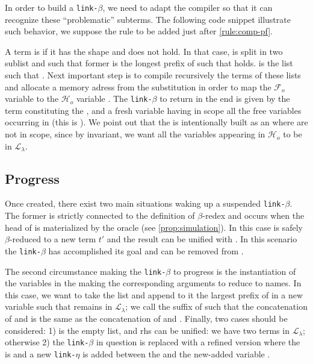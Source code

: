 \documentclass[sigconf,natbib=false,review]{acmart}
\newcommand{\llambda}{\ensuremath{\mathcal{L}_\lambda}\xspace}
\newcommand{\linkbeta}{\texttt{link-}\ensuremath{\beta}\xspace}
\newcommand{\linketa}{\texttt{link-}\ensuremath{\eta}\xspace}
\newcommand{\Fo}{\ensuremath{\mathcal{F}_{\!o}\xspace}} %
\newcommand{\Ho}{\ensuremath{\mathcal{H}_o}\xspace}
\begin{document}
In order to build a \linkbeta, we need to adapt the compiler so that it can
recognize these ``problematic'' subterms. The following code snippet illustrate
such behavior, we suppose the rule to be added just after \cref{rule:comp-pf}.



A term is \maybebeta if it has the shape  and
 does not hold. In that case,  is split in two
sublist  and  such that former is the longest prefix of
 such that  holds.  is the list
such that . Next important step is to compile
recursively the terms of these lists and allocate a memory adress 
from the substitution in order to map the \Fo variable  to
the \Ho variable . The \linkbeta to return in the end is given
by the term  constituting the \rhs,
and a fresh variable  having in scope all the free variables occurring
in  (this is \lhs). We point out that the \rhs is intentionally
built as an  where  are not in scope, since by
invariant, we want all the variables appearing in \Ho to be in \llambda.

\subsection{Progress}

Once created, there exist two main situations waking up a suspended \linkbeta.
The former is strictly connected to the definition of $\beta$-redex and occurs
when the head of \rhs is materialized by the oracle (see
\cref{prop:simulation}). In this case \rhs is safely
$\beta$-reduced to a new term $t'$ and the result can be unified with \lhs. In
this scenario the \linkbeta has accomplished its goal and can be removed from
\linkStore.

The second circumstance making the \linkbeta to progress is the instantiation of
the variables in the  making the corresponding arguments to
reduce to names. In this case, we want to take the list  and
append to it the largest prefix of  in a new variable
 such that  remains in \llambda; we call
 the suffix of  such that the concatenation of
 and  is the same as the concatenation of
 and . Finally, two cases should be considered: 1)
 is the empty list, \lhs and rhs can be unified: we have two
terms in \llambda; otherwise 2) the \linkbeta in question is replaced with a
refined version where the \rhs is   and a new
\linketa is added between the \lhs and the new-added variable .
\end{document}
